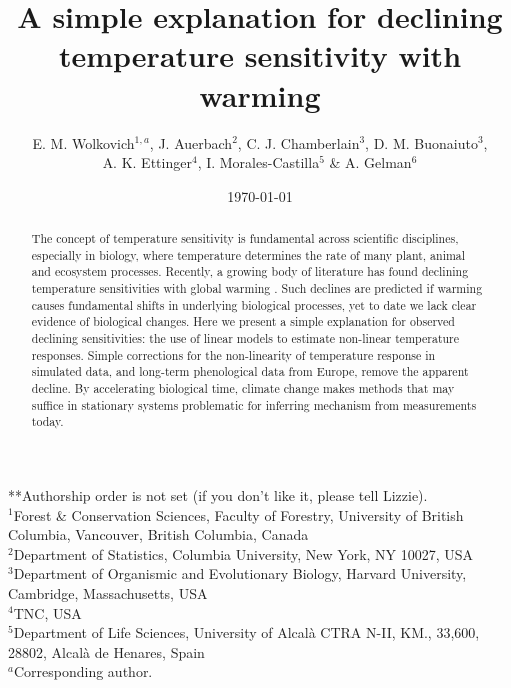 \documentclass[11pt,letter]{article}
\begin{document}
\title{A simple explanation for declining temperature sensitivity with warming} %
\author{E. M. Wolkovich$^{1,a}$,  J. Auerbach$^{2}$, C. J. Chamberlain$^{3}$, D. M. Buonaiuto$^{3}$, \\ A. K. Ettinger$^4$, I. Morales-Castilla$^{5}$ \& A. Gelman$^{6}$} 

\date{\today} 
\maketitle
**Authorship order is not set (if you don't like it, please tell Lizzie).\\
$^1$Forest \& Conservation Sciences, Faculty of Forestry, University of British Columbia, Vancouver, British Columbia, Canada\\
$^2$Department of Statistics, Columbia University, New York, NY 10027, USA\\
$^3$Department of Organismic and Evolutionary Biology, Harvard University, Cambridge, Massachusetts, USA\\
$^4$TNC, USA\\
$^5$Department of Life Sciences, University of Alcal\`a CTRA N-II, KM., 33,600, 28802, Alcal\`a de Henares, Spain\\
$^a$Corresponding author.


\begin{abstract} %
The concept of temperature sensitivity is fundamental across scientific disciplines, especially in biology, where temperature determines the rate of many plant, animal and ecosystem processes. Recently, a growing body of literature has found declining temperature sensitivities with global warming \citep{fu2015,gusewell2017,piao2017,dai2019ag}. Such declines are predicted if warming causes fundamental shifts in underlying biological processes, yet to date we lack clear evidence of biological changes. Here we present a simple explanation for observed declining sensitivities: the use of linear models to estimate non-linear temperature responses. Simple corrections for the non-linearity of temperature response in simulated data, and long-term phenological data from Europe, remove the apparent decline. By accelerating biological time, climate change makes methods that may suffice in stationary systems problematic for inferring mechanism from measurements today. 
\end{abstract}
\end{document}
